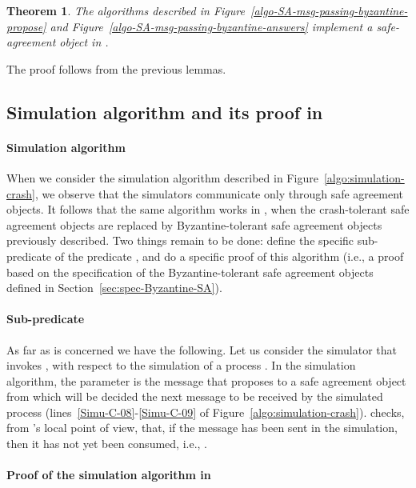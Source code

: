 \documentclass[11pt,letterpaper]{article}
\newtheorem{theorem}{Theorem}
\newlength {\afterproof}
\newcommand{\toto}{xxx}
\newenvironment{proofT}{\noindent{\bf Proof }}
{\hspace*{\fill}\par\vspace{\afterproof}}
\begin{document}
\begin{theorem}
\label{theorem-SA-object-is-correct}
The algorithms described in 
Figure~{\em\ref{algo-SA-msg-passing-byzantine-propose}} and 
 Figure~{\em\ref{algo-SA-msg-passing-byzantine-answers}} implement a 
safe-agreement object in  .
\end{theorem}

\begin{proofT}
The proof follows from the previous lemmas. 
\renewcommand{\toto}{theorem-SA-object-is-correct}
\end{proofT}

\subsection{Simulation algorithm and its proof in  }
\label{sec:simulation-byzantine}
\paragraph{Simulation algorithm}
When we consider the simulation algorithm described in
Figure~\ref{algo:simulation-crash}, we observe that the  simulators
communicate  only through  safe agreement objects.  It follows  that
the same algorithm works in , when the crash-tolerant
safe agreement objects are replaced by Byzantine-tolerant
safe agreement objects previously described.
Two  things remain to be done: define the specific sub-predicate
 of the predicate , and
do a specific proof of this algorithm
(i.e., a proof based on the specification of the  Byzantine-tolerant
safe agreement objects defined in Section~\ref{sec:spec-Byzantine-SA}).



\paragraph{Sub-predicate }
As far as  is concerned we have the following.
Let us consider the simulator  that invokes  ,
with respect to the simulation of a process .
In the simulation algorithm, the parameter  is the message 
that  proposes to a safe agreement object from which will be decided
the next message to be received  by the simulated process 
(lines~\ref{Simu-C-08}-\ref{Simu-C-09} of Figure~\ref{algo:simulation-crash}).
 checks, from 's local point of view,  that, if the message 
has been sent in the simulation, then it has not yet been consumed,
i.e., .



\paragraph{Proof of the simulation algorithm in }
\end{document}
